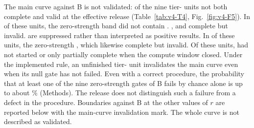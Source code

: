 The main curve against B is not validated:  of the nine tier- units  not both complete and valid at the effective release (Table~\ref{tab:v4-T4}, Fig.~\ref{fig:v4-F5}). %
In  of these units, the zero-strength band did not contain . , and  complete but invalid.  are suppressed rather than interpreted as positive results. %
In  of these units, the zero-strength , which likewise  complete but invalid. %
Of these units,  had not started or  only partially complete when the compute window closed. Under the implemented rule, an unfinished tier- unit invalidates the main curve even when its null gate has not failed. %
Even with a correct procedure, the probability that at least one of the nine zero-strength gates of B fails by chance alone is up to about \% (Methods). The release does not distinguish such a failure from a defect in the procedure. %
Boundaries against B at the other values of $r$ are reported below with the main-curve invalidation mark. The whole curve is not described as validated. %


